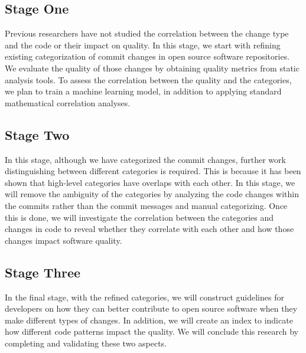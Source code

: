 \documentclass[10pt,conference]{IEEEtran}
\begin{document}
\subsection{Stage One}
Previous researchers have not studied the correlation between the change type and the code or their impact on quality. 
In this stage, we start with refining existing categorization of commit changes in open source software repositories.
We evaluate the quality of those changes by obtaining quality metrics from static analysis tools.
To assess the correlation between the quality and the categories, we plan to train a machine learning model, in addition to applying standard mathematical correlation analyses.

\subsection{Stage Two}
In this stage, although we have categorized the commit changes, further work distinguishing between different categories is required.
This is because it has been shown that high-level categories have overlaps with each other.
In this stage, we will remove the ambiguity of the categories by analyzing the code changes within the commits rather than the commit messages and manual categorizing.
Once this is done, we will investigate the correlation between the categories and changes in code to reveal whether they correlate with each other and how those changes impact software quality.

\subsection{Stage Three}
In the final stage, with the refined categories, we will construct guidelines for developers on how they can better contribute to open source software when they make different types of changes.
In addition, we will create an index to indicate how different code patterns impact the quality.
We will conclude this research by completing and validating these two aspects. 
\end{document}

